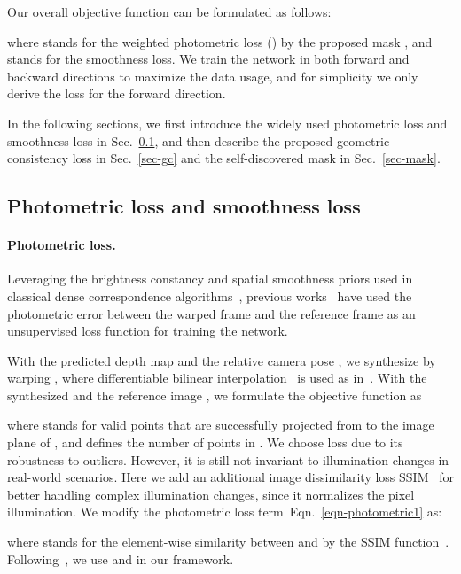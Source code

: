 \documentclass{article}
\newcommand{\equref}[1]{Eqn.~\ref{#1}}
\newcommand{\secref}[1]{Sec.~\ref{#1}}
\begin{document}
Our overall objective function can be formulated as follows:

where  stands for the weighted photometric loss () by the proposed mask , and  stands for the smoothness loss.
We train the network in both forward and backward directions to maximize the data usage, and for simplicity we only derive the loss for the forward direction.

In the following sections, we first introduce the widely used photometric loss and smoothness loss in \secref{sec-photo-smooth}, and then describe the proposed geometric consistency loss in \secref{sec-gc} and the self-discovered mask in \secref{sec-mask}.


\subsection{Photometric loss and smoothness loss}\label{sec-photo-smooth}

\paragraph{Photometric loss.}
Leveraging the brightness constancy and spatial smoothness priors used in classical dense correspondence algorithms~\cite{baker2004lucas},
previous works~\cite{zhou2017unsupervised, yin2018geonet, zou2018df, ranjan2019cc} have used the photometric error between the warped frame and the reference frame as an unsupervised loss function for training the network.

With the predicted depth map  and the relative camera pose , 
we synthesize  by warping , where differentiable bilinear interpolation~\cite{jaderberg2015stn} is used as in~\cite{zhou2017unsupervised}.
With the synthesized  and the reference image , we formulate the objective function as

where  stands for valid points that are successfully projected from  to the image plane of ,
and  defines the number of points in .
We choose  loss due to its robustness to outliers. However, it is still not invariant to illumination changes in real-world scenarios. Here we add an additional image dissimilarity loss SSIM~\cite{wang2004image} for better handling complex illumination changes, since it normalizes the pixel illumination.
We modify the photometric loss term~\equref{eqn-photometric1} as:

where  stands for the element-wise similarity between  and  by the SSIM function~\cite{wang2004image}.
Following~\cite{godard2017unsupervised, yin2018geonet, ranjan2019cc}, we use   and  in our framework.
\end{document}
